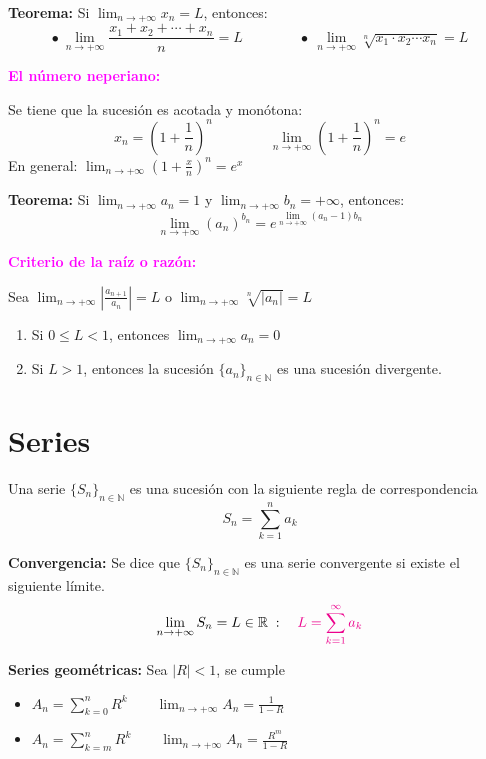 \documentclass[11pt,a4paper]{article}
\newcommand{\cn}[1]{\raisebox{.5pt}{\textcircled{\raisebox{-.9pt}{\scriptsize #1}}}}
\begin{document}
\textbf{Teorema:} Si $\displaystyle\lim_{n\to+\infty}x_n = L$, entonces:
\[
\bullet\ \lim_{n\to+\infty}\frac{x_1 + x_2 + \cdots + x_n}{n} = L
\qquad\qquad
\bullet\ \lim_{n\to+\infty}\sqrt[n]{x_1\cdot x_2\cdots x_n} = L
\]

\textcolor{magenta}{\textbf{El número neperiano:}}

Se tiene que la sucesión es acotada y monótona:
\[
x_n = \left(1 + \frac{1}{n}\right)^n \qquad\qquad
\lim_{n\to+\infty}\left(1 + \frac{1}{n}\right)^n = e
\]
En general: \quad $\displaystyle\lim_{n\to+\infty}\left(1 + \frac{x}{n}\right)^n = e^x$

\textcolor{verde}{\textbf{Teorema:}} Si $\displaystyle\lim_{n\to+\infty}a_n = 1$ y
$\displaystyle\lim_{n\to+\infty}b_n = +\infty$, entonces:
\[\lim_{n\to+\infty}(a_n)^{b_n} = e^{\lim\limits_{n\to+\infty}(a_n - 1)b_n}\]

\textcolor{magenta}{\textbf{Criterio de la raíz o razón:}}

Sea \quad $\displaystyle\lim_{n\to+\infty}\left|\frac{a_{n+1}}{a_n}\right| = L$ \quad o \quad
$\displaystyle\lim_{n\to+\infty}\sqrt[n]{|a_n|} = L$
\begin{enumerate}[label=\cn{\arabic*}]
  \item Si $0 \leq L < 1$, entonces $\displaystyle\lim_{n\to+\infty}a_n = 0$
  \item Si $L > 1$, entonces la sucesión $\{a_n\}_{n\in\mathbb{N}}$ es una sucesión divergente.
\end{enumerate}

\newpage
\section{Series}

Una serie $\{S_n\}_{n\in\mathbb{N}}$ es una sucesión con la siguiente regla de correspondencia
\[S_n = \sum_{k=1}^{n}a_k\]

\textbf{Convergencia:} Se dice que $\{S_n\}_{n\in\mathbb{N}}$ es una serie convergente si existe
el siguiente límite.
\[\lim_{n\to+\infty}S_n = L \in \mathbb{R}\;: \quad \textcolor{magenta}{L = \sum_{k=1}^{\infty}a_k}\]

\textbf{Series geométricas:} Sea $|R| < 1$, se cumple
\begin{itemize}
  \item $A_n = \displaystyle\sum_{k=0}^{n}R^k \qquad \lim_{n\to+\infty}A_n = \frac{1}{1 - R}$
  \item $A_n = \displaystyle\sum_{k=m}^{n}R^k \qquad \lim_{n\to+\infty}A_n = \frac{R^m}{1 - R}$
\end{itemize}
\end{document}
